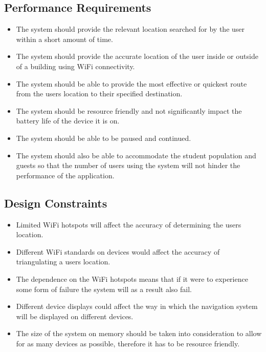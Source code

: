 \documentclass[a4paper,12pt]{article}
\begin{document}
\subsection{Performance Requirements}
\begin{itemize}
\small
\item The system should provide the relevant location searched for by the user within a short amount of time.
\item The system should provide the accurate location of the user inside or outside of a building using WiFi connectivity.
\item The system should be able to provide the most effective or quickest route from the users location to their specified destination.
\item The system should be resource friendly and not significantly impact the battery life of the device it is on.
\item The system should be able to be paused and continued.
\item The system should also be able to accommodate the student population and guests so that the number of users using the system will not hinder the performance of the application.
\end{itemize}
\subsection{Design Constraints}
\begin{itemize}
\small
\item Limited WiFi hotspots will affect the accuracy of determining the users location.
\item Different WiFi standards on devices would affect the accuracy of triangulating a users location.
\item The dependence on the WiFi hotspots means that if it were to experience some form of failure the system will as a result also fail.
\item Different device displays could affect the way in which the navigation system will be displayed on different devices.
\item The size of the system on memory should be taken into consideration to allow for as many devices as possible, therefore it has to be resource friendly.
\end{itemize}
\end{document}
